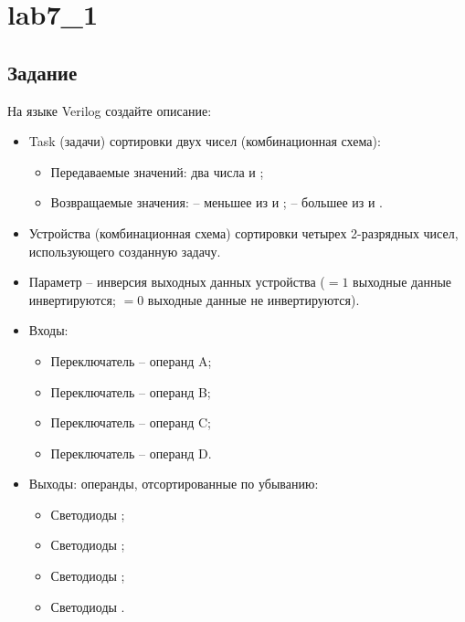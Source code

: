 





\tableofcontents
\newpage
\listoffigures
\lstlistoflistings
\newpage

\section{lab7\_1}

\subsection{Задание}

На языке Verilog создайте описание:
\begin{itemize}
	\item Task (задачи) сортировки двух чисел (комбинационная схема):
		\begin{itemize}
			\item Передаваемые значений: два числа  и ;
			\item Возвращаемые значения:  – меньшее из  и ;  – большее из  и .
		\end{itemize}
	\item Устройства (комбинационная схема) сортировки четырех 2-разрядных чисел, использующего созданную задачу.
	\item Параметр  -- инверсия выходных данных устройства ($=1$ выходные данные инвертируются; $=0$ выходные данные не инвертируются).
	\item Входы:
		\begin{itemize}
			\item Переключатель  -- операнд A;
			\item Переключатель  -- операнд B;
			\item Переключатель  -- операнд C;
			\item Переключатель  -- операнд D.
		\end{itemize}
	\item Выходы: операнды, отсортированные по убыванию:
		\begin{itemize}
			\item Светодиоды ;
			\item Светодиоды ;
			\item Светодиоды ;
			\item Светодиоды .
		\end{itemize}
\end{itemize}


